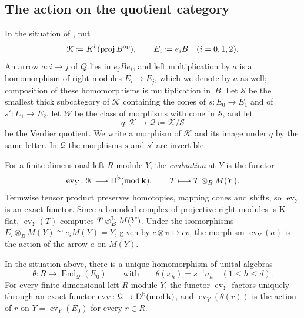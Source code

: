 \subsection{The action on the quotient category}
\label{subsec:action}

In the situation of , put
\[
  \mathcal{K}\coloneqq K^b(\operatorname{proj}B^{\mathrm{op}}),\qquad
  E_i\coloneqq e_iB\quad(i=0,1,2).
\]
An arrow ${a\colon i\to j}$ of $Q$ lies in $e_jBe_i$, and left multiplication by
$a$ is a homomorphism of right modules ${E_i\to E_j}$, which we denote by $a$ as
well; composition of these homomorphisms is multiplication in~$B$. Let
$\mathcal{S}$ be the smallest thick subcategory of $\mathcal{K}$ containing
the cones of ${s\colon E_0\to E_1}$ and of ${s'\colon E_1\to E_2}$, let
$\mathcal{W}$ be the class of morphisms with cone in $\mathcal{S}$, and let
\[
  q\colon\mathcal{K}\longrightarrow\mathcal{Q}\coloneqq\mathcal{K}/\mathcal{S}
\]
be the Verdier quotient. We write a morphism of $\mathcal{K}$ and its image
under $q$ by the same letter. In $\mathcal{Q}$ the morphisms $s$ and $s'$ are
invertible.

For a finite-dimensional left $R$-module $Y$, the \emph{evaluation} at $Y$ is
the functor
\[
  \operatorname{ev}_Y\colon\mathcal{K}\longrightarrow
  \DerCat[b]{\operatorname{mod}\kk},\qquad T\longmapsto T\otimes_BM(Y).
\]
Termwise tensor product preserves homotopies, mapping cones and shifts, so
$\operatorname{ev}_Y$ is an exact functor. Since a bounded complex of
projective right modules is K-flat, $\operatorname{ev}_Y(T)$ computes
${T\Lotimes[B]M(Y)}$. Under the isomorphisms ${E_i\otimes_BM(Y)}\cong{ e_iM(Y)}={Y}$,
given by ${c\otimes v\mapsto cv}$, the morphism $\operatorname{ev}_Y(a)$ is the
action of the arrow $a$ on $M(Y)$.

\begin{proposition}
  \label{prop:quotient-action}
  In the situation above, there is a unique homomorphism of unital algebras
  \[
    \theta\colon R\longrightarrow\operatorname{End}_{\mathcal{Q}}(E_0)
    \qquad\text{with}\qquad\theta(x_h)=s^{-1}a_h\quad(1\leq h\leq d).
  \]
  For every finite-dimensional left $R$-module $Y$, the functor
  $\operatorname{ev}_Y$ factors uniquely through an exact functor
  ${\operatorname{ev}_Y\colon\mathcal{Q}\to\DerCat[b]{\operatorname{mod}\kk}}$,
  and $\operatorname{ev}_Y(\theta(r))$ is the action of $r$ on
  ${Y=\operatorname{ev}_Y(E_0)}$ for every ${r\in R}$.
\end{proposition}

